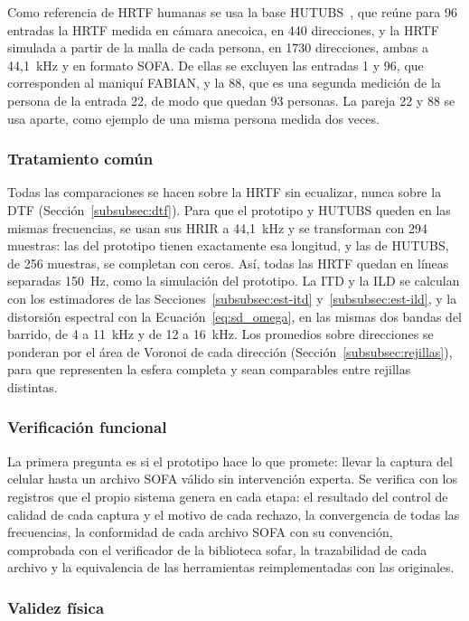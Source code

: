 Como referencia de HRTF humanas se usa la base HUTUBS~\cite{Brinkmann2019}, que reúne para 96 entradas la HRTF medida en cámara anecoica, en 440 direcciones, y la HRTF simulada a partir de la malla de cada persona, en 1730 direcciones, ambas a 44,1~kHz y en formato SOFA. De ellas se excluyen las entradas 1 y 96, que corresponden al maniquí FABIAN, y la 88, que es una segunda medición de la persona de la entrada 22, de modo que quedan 93 personas. La pareja 22 y 88 se usa aparte, como ejemplo de una misma persona medida dos veces.

\subsubsection{Tratamiento común}

Todas las comparaciones se hacen sobre la HRTF sin ecualizar, nunca sobre la DTF (Sección~\ref{subsubsec:dtf}). Para que el prototipo y HUTUBS queden en las mismas frecuencias, se usan sus HRIR a 44,1~kHz y se transforman con 294 muestras: las del prototipo tienen exactamente esa longitud, y las de HUTUBS, de 256 muestras, se completan con ceros. Así, todas las HRTF quedan en líneas separadas 150~Hz, como la simulación del prototipo. La ITD y la ILD se calculan con los estimadores de las Secciones~\ref{subsubsec:est-itd} y~\ref{subsubsec:est-ild}, y la distorsión espectral con la Ecuación~\eqref{eq:sd_omega}, en las mismas dos bandas del barrido, de 4 a 11~kHz y de 12 a 16~kHz. Los promedios sobre direcciones se ponderan por el área de Voronoi de cada dirección (Sección~\ref{subsubsec:rejillas}), para que representen la esfera completa y sean comparables entre rejillas distintas.

\subsubsection{Verificación funcional}

La primera pregunta es si el prototipo hace lo que promete: llevar la captura del celular hasta un archivo SOFA válido sin intervención experta. Se verifica con los registros que el propio sistema genera en cada etapa: el resultado del control de calidad de cada captura y el motivo de cada rechazo, la convergencia de todas las frecuencias, la conformidad de cada archivo SOFA con su convención, comprobada con el verificador de la biblioteca sofar, la trazabilidad de cada archivo y la equivalencia de las herramientas reimplementadas con las originales.

\subsubsection{Validez física}

